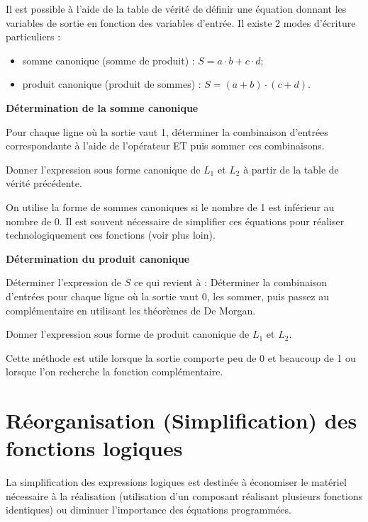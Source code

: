 \documentclass[11pt,oneside]{article}
\begin{document}
Il est possible à l'aide de la table de vérité de définir une équation donnant les variables de sortie en fonction des variables d'entrée. Il existe 2 modes d'écriture particuliers : 
\begin{itemize}
\item somme canonique (somme de produit) : $S=a\cdot b + c\cdot d$;
\item produit canonique (produit de sommes) : $S=(a+b) \cdot (c+d)$.
\end{itemize}

\begin{methode}
\textbf{Détermination de la somme canonique}

Pour chaque ligne où la sortie vaut 1, déterminer la combinaison d'entrées correspondante à l'aide de l'opérateur ET puis sommer ces combinaisons. 
\end{methode}


\begin{exemple}
Donner l'expression sous forme canonique de $L_1$ et $L_2$ à partir de la table de vérité précédente. 
\end{exemple}

\begin{rem}
On utilise la forme de sommes canoniques si le nombre de 1 est inférieur au nombre de 0. Il est souvent nécessaire de simplifier ces équations pour réaliser technologiquement ces fonctions (voir plus loin).
\end{rem}

\begin{methode}
\textbf{Détermination du produit canonique}

Déterminer l'expression de $\overline{S}$ ce qui revient à :
Déterminer la combinaison d'entrées pour chaque ligne où la sortie vaut 0, les sommer, puis passez au complémentaire en utilisant les théorèmes de De Morgan. 
\end{methode}

\begin{exemple}
Donner l'expression sous forme de produit canonique de $L_1$ et $L_2$.
\end{exemple}

\begin{rem}
Cette méthode est utile lorsque la sortie comporte peu de 0 et beaucoup de 1 ou lorsque l'on recherche la fonction complémentaire. 
\end{rem}

\section{Réorganisation (Simplification) des fonctions logiques}
La simplification des expressions logiques est destinée à économiser le matériel nécessaire à la réalisation (utilisation d'un composant réalisant plusieurs fonctions identiques) ou diminuer l'importance des équations programmées.
\end{document}
